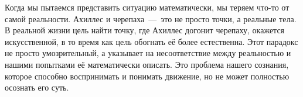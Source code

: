 

Когда мы пытаемся представить ситуацию математически, мы теряем что-то от самой реальности. Ахиллес и черепаха~---~это не просто точки, а реальные тела. В реальной жизни цель найти точку, где Ахиллес догонит черепаху, окажется искусственной, в то время как цель обогнать её более естественна. Этот парадокс не просто умозрительный, а указывает на несоответствие между реальностью и нашими попытками её математически описать. Это проблема нашего сознания, которое способно воспринимать и понимать движение, но не может полностью осознать его суть.

